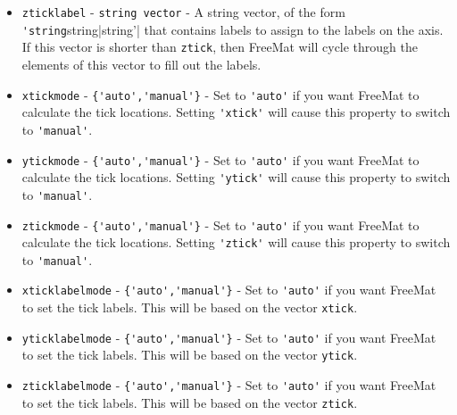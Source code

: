 \begin{itemize}
\item  \verb|zticklabel| - \verb|string vector| - A string vector, of the form \verb|'string|string|string'|
 that contains labels to assign to the labels on the axis.  If this vector is shorter than
 \verb|ztick|, then FreeMat will cycle through the elements of this vector to fill out the labels.

\item  \verb|xtickmode| - \verb|{'auto','manual'}| - Set to \verb|'auto'| if you want FreeMat to calculate
 the tick locations.  Setting \verb|'xtick'| will cause this property to switch to \verb|'manual'|.

\item  \verb|ytickmode| - \verb|{'auto','manual'}| - Set to \verb|'auto'| if you want FreeMat to calculate
 the tick locations.  Setting \verb|'ytick'| will cause this property to switch to \verb|'manual'|.

\item  \verb|ztickmode| - \verb|{'auto','manual'}| - Set to \verb|'auto'| if you want FreeMat to calculate
 the tick locations.  Setting \verb|'ztick'| will cause this property to switch to \verb|'manual'|.

\item  \verb|xticklabelmode| - \verb|{'auto','manual'}| - Set to \verb|'auto'| if you want FreeMat to
 set the tick labels.  This will be based on the vector \verb|xtick|.

\item  \verb|yticklabelmode| - \verb|{'auto','manual'}| - Set to \verb|'auto'| if you want FreeMat to
 set the tick labels.  This will be based on the vector \verb|ytick|.

\item  \verb|zticklabelmode| - \verb|{'auto','manual'}| - Set to \verb|'auto'| if you want FreeMat to
 set the tick labels.  This will be based on the vector \verb|ztick|.

\end{itemize}
